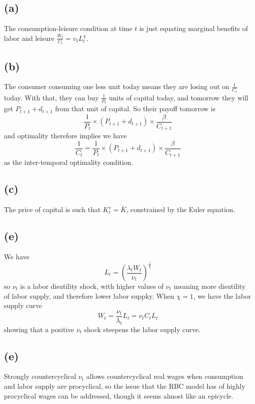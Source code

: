\documentclass[12pt]{article}
\begin{document}
\subsection*{(a)}

The consumption-leisure condition at time $t$ is just equating marginal benefits of labor and leisure $\frac{W_t}{C_t} = v_t L_t^\chi$.

\subsection*{(b)}

The consumer consuming one less unit today means they are losing out on $\frac{1}{C_t}$ today. 
With that, they can buy $\frac{1}{P_t}$ units of capital today, and tomorrow they will get $P_{t+1} + d_{t+1}$ from that unit of capital. 
So their payoff tomorrow is 
\[
\frac{1}{P_t} \times (P_{t+1} + d_{t+1}) \times \frac{\beta}{C_{t+1}}
\]
and optimality therefore implies we have
\[
\frac{1}{C_t} = \frac{1}{P_t} \times (P_{t+1} + d_{t+1}) \times \frac{\beta}{C_{t+1}}
\]
as the inter-temporal optimality condition.

\subsection*{(c)}

The price of capital is such that $K_t^s = \bar{K}$, constrained by the Euler equation.

\subsection*{(e)} 
We have
	\begin{equation*}
	L_t = \left( \frac{\lambda_t W_t}{\nu_t} \right)^{\frac{1}{\chi}}
	\end{equation*}
	so $\nu_t$ is a labor disutility shock, with higher values of $\nu_t$ meaning more disutility of labor supply, and therefore lower labor suppky. 
	When $\chi = 1$, we have the labor supply curve 
	\begin{equation*}
	W_t = \frac{\nu_t}{\lambda_t} L_t = \nu_t C_t L_t  
	\end{equation*}
	showing that a positive $\nu_t$ shock steepens the labor supply curve. 
	
	\subsection*{(e)} Strongly countercyclical $\nu_t$ allows countercyclical real wages when consumption and labor supply are procyclical, so the issue that the RBC model has of highly procyclical wages can be addressed, though it seems almost like an epicycle.
\end{document}
